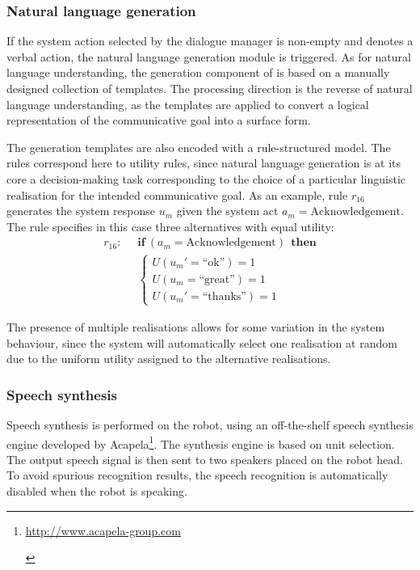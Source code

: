 \subsubsection*{Natural language generation}

If the system action selected by the dialogue manager is non-empty and denotes a verbal action, the natural language generation module is triggered.  As for natural language understanding, the generation component of \opendial{} is based on a manually designed collection of templates.  The processing direction is the reverse of natural language understanding, as the templates are applied to convert a logical representation of the communicative goal into a surface form. 

The generation templates are also encoded with a rule-structured model.  The rules correspond here to utility rules, since natural language generation is at its core a decision-making task corresponding to the choice of a particular linguistic realisation for the intended communicative goal.  As an example, rule $r_{16}$ generates the system response $u_m$ given the system act $a_m=\mathrm{Acknowledgement}$.  The rule specifies in this case three alternatives with equal utility:
\begin{align*}
r_{16}: &\;\;\textbf{if} \ (a_m = \mathrm{Acknowledgement} )  \ \ \textbf{then} \\ 
& \;\; \begin{cases} U(u_m'=\text{``ok''}) = 1 \\ U(u_m=\text{``great''}) = 1 \\ U(u_m'=\text{``thanks''}) = 1 \end{cases}
\end{align*}

The presence of multiple realisations allows for some variation in the system behaviour, since the system will automatically select one realisation at random due to the uniform utility assigned to the alternative realisations.

\subsubsection*{Speech synthesis}

Speech synthesis is performed on the robot, using an off-the-shelf speech synthesis engine developed by Acapela\footnote{\begin{scriptsize}\url{http://www.acapela-group.com}\end{scriptsize}}. The synthesis engine is based on unit selection. The output speech signal is then sent to two speakers placed on the robot head. To avoid spurious recognition results, the speech recognition is automatically disabled when the robot is speaking.  
 
